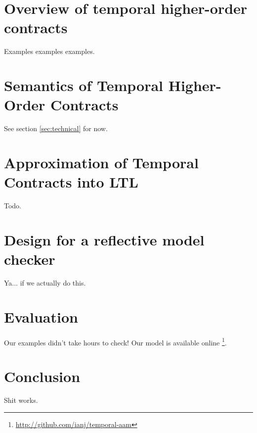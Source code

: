 \documentclass[preprint,onecolumn,9pt]{sigplanconf} %
\begin{document}
\section{Overview of temporal higher-order contracts}

Examples examples examples.

\section{Semantics of Temporal Higher-Order Contracts}

See section \ref{sec:technical} for now.

\section{Approximation of Temporal Contracts into LTL}

Todo.

\section{Design for a reflective model checker}

Ya... if we actually do this.

\section{Evaluation}

Our examples didn't take hours to check!
%
Our model is available online \footnote{\url{http://github.com/ianj/temporal-aam}}.

\section{Conclusion}

Shit works.

\end{document}
